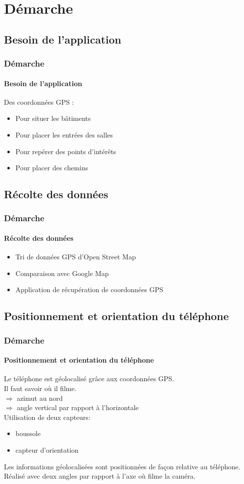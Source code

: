 \section{Démarche}
\subsection{Besoin de l'application}

\begin{frame}
\frametitle{Démarche}
\framesubtitle{Besoin de l'application}
Des coordonnées GPS :
\begin{itemize}
	\item Pour situer les bâtiments
	\item Pour placer les entrées des salles
	\item Pour repérer des points d'intérêts
	\item Pour placer des chemins
\end{itemize}
\end{frame}

\subsection{Récolte des données}

\begin{frame}
\frametitle{Démarche}
\framesubtitle{Récolte des données}
\begin{itemize}
	\item Tri de données GPS d'Open Street Map
	\item Comparaison avec Google Map
	\item Application de récupération de coordonnées GPS
\end{itemize}
\end{frame}

\subsection{Positionnement et orientation du téléphone}

\begin{frame}
\frametitle{Démarche}
\framesubtitle{Positionnement et orientation du téléphone}
Le téléphone est géolocalisé grâce aux coordonnées GPS.\\
Il faut savoir où il filme.\\
$\Rightarrow$ azimut au nord\\
$\Rightarrow$ angle vertical par rapport à l'horizontale\\
Utilisation de deux capteurs:
\begin{itemize}
	\item boussole
	\item capteur d'orientation
\end{itemize}
Les informations géolocalisées sont positionnées de façon relative au téléphone.
Réalisé avec deux angles par rapport à l'axe où filme la caméra.
\end{frame}

